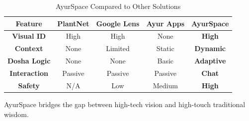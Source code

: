 \documentclass[12pt]{article}
\begin{document}
\vspace{5mm}

\begin{table}[htbp]
\caption{AyurSpace Compared to Other Solutions}
\begin{center}
\begin{tabular}{|c|c|c|c|c|}
\hline
\textbf{Feature} & \textbf{PlantNet} & \textbf{Google Lens} & \textbf{Ayur Apps} & \textbf{AyurSpace} \\
\hline
\textbf{Visual ID} & High & High & None & \textbf{High} \\
\hline
\textbf{Context} & None & Limited & Static & \textbf{Dynamic} \\
\hline
\textbf{Dosha Logic} & None & None & Basic & \textbf{Adaptive} \\
\hline
\textbf{Interaction} & Passive & Passive & Passive & \textbf{Chat} \\
\hline
\textbf{Safety} & N/A & Low & Medium & \textbf{High} \\
\hline
\end{tabular}
\label{tab1}
\end{center}
\end{table}

AyurSpace bridges the gap between high-tech vision and high-touch traditional wisdom.
\end{document}
